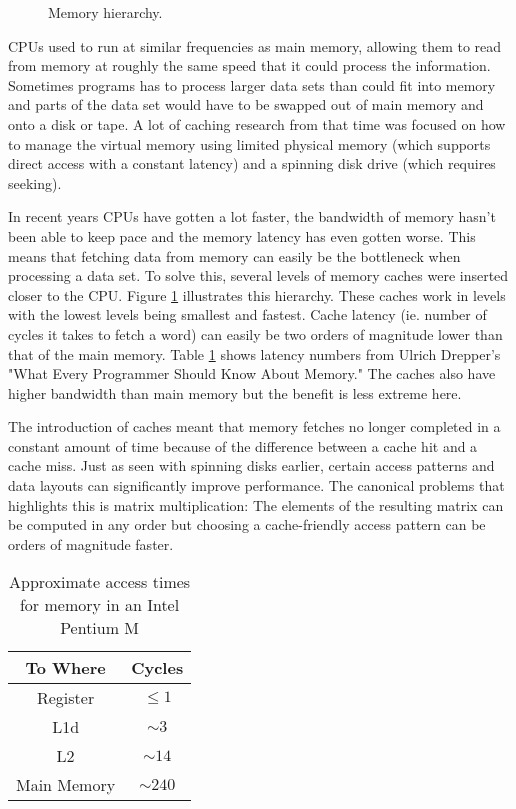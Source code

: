 \documentclass[a4paper,oneside]{memoir}
\begin{document}
\begin{figure}
  \centering
  
  \caption{Memory hierarchy.}
  \label{hierarchy}
\end{figure}

CPUs used to run at similar frequencies as main memory, allowing them to read
from memory at roughly the same speed that it could process the information.
Sometimes programs has to process larger data sets than could fit into memory
and parts of the data set would have to be swapped out of main memory and onto
a disk or tape. A lot of caching research from that time was focused on how to
manage the virtual memory using limited physical memory (which supports direct
access with a constant latency) and a spinning disk drive (which requires seeking).

In recent years CPUs have gotten a lot faster, the bandwidth of memory
hasn't been able to keep pace and the memory latency has even gotten worse.\cite{Novark:2006,Chilimbi:1999,Reinhold:1994,Eiron:1999} This
means that fetching data from memory can easily be the bottleneck when processing
a data set. To solve this, several levels of memory caches were inserted closer
to the CPU. Figure \ref{hierarchy} illustrates this hierarchy. These caches work
in levels with the lowest levels being smallest
and fastest. Cache latency (ie. number of cycles it takes to fetch a word) can
easily be two orders of magnitude lower than that of the main memory. Table
\ref{latency} shows latency numbers from Ulrich Drepper's "What
Every Programmer Should Know About Memory." \cite{Drepper}
The caches also have higher bandwidth than main memory but
the benefit is less extreme here.

The introduction of caches meant that memory fetches no longer completed in a
constant amount of time because of the difference between a cache hit and
a cache miss. Just as seen with spinning disks earlier, certain access patterns
and data layouts can significantly improve performance.\cite{Chilimbi:1999}
The canonical problems
that highlights this is matrix multiplication: The elements of the resulting
matrix can be computed in any order but choosing a cache-friendly access pattern
can be orders of magnitude faster.\cite{Chilimbi:1999,Eiron:1999}

\begin{table}
  \centering
  \caption{Approximate access times for memory in an Intel Pentium M}
  \begin{tabular}{c | c}
    To Where & Cycles \\ \hline
    Register & $\le 1$ \\
    L1d & $\sim 3$ \\
    L2 & $\sim 14$ \\
    Main Memory & $\sim 240$
  \end{tabular}
  \label{latency}
\end{table}
\end{document}
